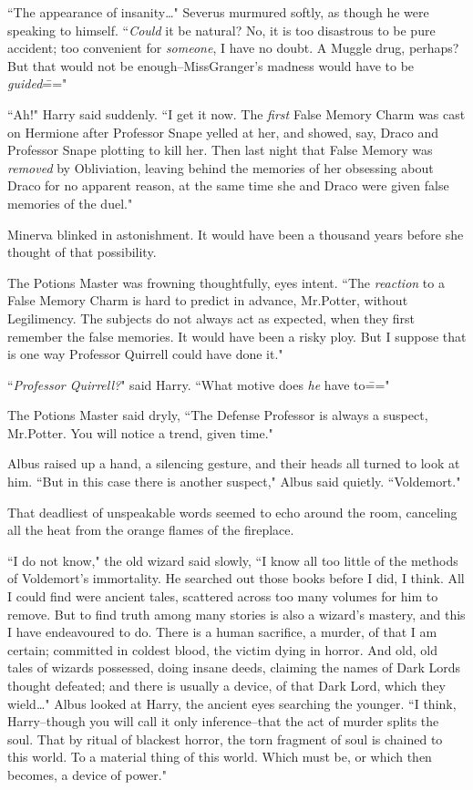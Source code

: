 ``The appearance of insanity{\ldots}" Severus murmured softly, as though he were speaking to himself. ``\emph{Could} it be natural? No, it is too disastrous to be pure accident; too convenient for \emph{someone}, I have no doubt. A Muggle drug, perhaps? But that would not be enough\---Miss\?Granger's madness would have to be \emph{guided}\==="

``Ah!" Harry said suddenly. ``I get it now. The \emph{first} False Memory Charm was cast on Hermione after Professor Snape yelled at her, and showed, say, Draco and Professor Snape plotting to kill her. Then last night that False Memory was \emph{removed} by Obliviation, leaving behind the memories of her obsessing about Draco for no apparent reason, at the same time she and Draco were given false memories of the duel."

Minerva blinked in astonishment. It would have been a thousand years before she thought of that possibility.

The Potions Master was frowning thoughtfully, eyes intent. ``The \emph{reaction} to a False Memory Charm is hard to predict in advance, Mr.\?Potter, without Legilimency. The subjects do not always act as expected, when they first remember the false memories. It would have been a risky ploy. But I suppose that is one way Professor Quirrell could have done it."

``\emph{Professor Quirrell?}" said Harry. ``What motive does \emph{he} have to\==="

The Potions Master said dryly, ``The Defense Professor is always a suspect, Mr.\?Potter. You will notice a trend, given time."

Albus raised up a hand, a silencing gesture, and their heads all turned to look at him. ``But in this case there is another suspect," Albus said quietly. ``Voldemort."

That deadliest of unspeakable words seemed to echo around the room, canceling all the heat from the orange flames of the fireplace.

``I do not know," the old wizard said slowly, ``I know all too little of the methods of Voldemort's immortality. He searched out those books before I did, I think. All I could find were ancient tales, scattered across too many volumes for him to remove. But to find truth among many stories is also a wizard's mastery, and this I have endeavoured to do. There is a human sacrifice, a murder, of that I am certain; committed in coldest blood, the victim dying in horror. And old, old tales of wizards possessed, doing insane deeds, claiming the names of Dark Lords thought defeated; and there is usually a device, of that Dark Lord, which they wield{\ldots}" Albus looked at Harry, the ancient eyes searching the younger. ``I think, Harry\---though you will call it only inference\---that the act of murder splits the soul. That by ritual of blackest horror, the torn fragment of soul is chained to this world. To a material thing of this world. Which must be, or which then becomes, a device of power."

